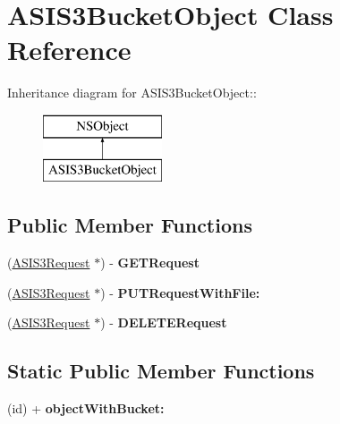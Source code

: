 \hypertarget{interface_a_s_i_s3_bucket_object}{
\section{ASIS3BucketObject Class Reference}
\label{interface_a_s_i_s3_bucket_object}
}
Inheritance diagram for ASIS3BucketObject::\begin{figure}[H]
\begin{center}
\leavevmode
\includegraphics[height=2cm]{interface_a_s_i_s3_bucket_object}
\end{center}
\end{figure}
\subsection*{Public Member Functions}
\begin{DoxyCompactItemize}
\item 
\hypertarget{interface_a_s_i_s3_bucket_object_a3c14732ec4fc82f873204c759cd433f0}{
(\hyperlink{interface_a_s_i_s3_request}{ASIS3Request} $\ast$) -\/ {\bfseries GETRequest}}
\label{interface_a_s_i_s3_bucket_object_a3c14732ec4fc82f873204c759cd433f0}

\item 
\hypertarget{interface_a_s_i_s3_bucket_object_aada88380c29f13598af15d2b68539927}{
(\hyperlink{interface_a_s_i_s3_request}{ASIS3Request} $\ast$) -\/ {\bfseries PUTRequestWithFile:}}
\label{interface_a_s_i_s3_bucket_object_aada88380c29f13598af15d2b68539927}

\item 
\hypertarget{interface_a_s_i_s3_bucket_object_aab3e8d54751022a03cd66a494277658a}{
(\hyperlink{interface_a_s_i_s3_request}{ASIS3Request} $\ast$) -\/ {\bfseries DELETERequest}}
\label{interface_a_s_i_s3_bucket_object_aab3e8d54751022a03cd66a494277658a}

\end{DoxyCompactItemize}
\subsection*{Static Public Member Functions}
\begin{DoxyCompactItemize}
\item 
\hypertarget{interface_a_s_i_s3_bucket_object_a5907cfaf80350efb40b1821765a6e89a}{
(id) + {\bfseries objectWithBucket:}}
\label{interface_a_s_i_s3_bucket_object_a5907cfaf80350efb40b1821765a6e89a}

\end{DoxyCompactItemize}
